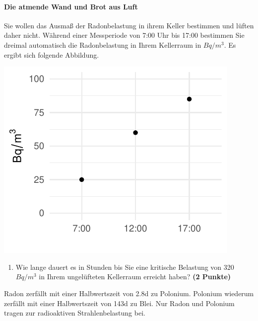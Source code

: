\documentclass[a4paper, 10pt]{scrartcl}\usepackage[]{graphicx}\usepackage[]{xcolor}
\makeatletter
\def\maxwidth{ %
  \ifdim\Gin@nat@width>\linewidth
    \linewidth
  \else
    \Gin@nat@width
  \fi
}
\newenvironment{knitrout}{}{} %
\makeatother
\begin{document}
\paragraph{Die atmende Wand und Brot aus Luft}



Sie wollen das Ausma{\ss} der Radonbelastung in ihrem Keller bestimmen und
l{\"u}ften daher nicht. W{\"a}hrend einer Messperiode von 7:00 Uhr bis
17:00 bestimmen Sie dreimal automatisch die Radonbelastung in
Ihrem Kellerraum in $Bq/m^3$. Es ergibt sich folgende Abbildung.

\begin{knitrout}
\color{fgcolor}

{\centering \includegraphics[width=\maxwidth]{img/math-10-1} 

}


\end{knitrout}

\vspace{-0.75cm}

\begin{enumerate}
\item Wie lange dauert es in Stunden bis Sie eine kritische Belastung von
  320$Bq/m^3$ in Ihrem ungel{\"u}fteten Kellerraum erreicht haben?
  \textbf{(2 Punkte)}
\end{enumerate}

Radon zerf{\"a}llt mit einer Halbwertszeit von 2.8d zu
Polonium. Polonium wiederum zerf{\"a}llt mit einer Halbwertszeit von
143d zu Blei. Nur Radon und Polonium tragen zur
radioaktiven Strahlenbelastung bei.
\end{document}
